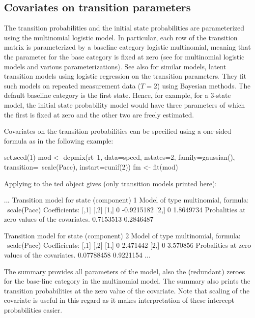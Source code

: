 \documentclass[article]{jss}
\begin{document}
\subsection{Covariates on transition parameters}

The transition probabilities and the initial state probabilities
are parameterized using the multinomial
logistic model.   In particular, each row of the transition matrix is
parameterized by a baseline category logistic multinomial, 
meaning that the parameter for the
base category is fixed at zero (see \citet[see][p.\ 267
ff.]{Agresti2002} for multinomial logistic models and various
parameterizations). See also \citet{Chung2007} for similar models, latent transition models using logistic regression on the transition parameters. They fit such models on repeated measurement
data ($T=2$) using Bayesian methods.  The default baseline category is the first state.
Hence, for example, for a 3-state model, the initial state probability
model would have three parameters of which the first is fixed at zero
and the other two are freely estimated.

Covariates on the transition probabilities can be specified using a
one-sided formula as in the following example:
\begin{CodeChunk}
\begin{CodeInput}
set.seed(1)
mod <- depmix(rt~1, data=speed, nstates=2, family=gaussian(), 
  transition=~scale(Pacc), instart=runif(2))
fm <- fit(mod)
\end{CodeInput}
\end{CodeChunk}

Applying  to the ted object gives (only transition models
printed here): 
\begin{CodeChunk}
\begin{CodeOutput}
...
Transition model for state (component) 1 
Model of type multinomial, formula: ~scale(Pacc)
Coefficients: 
	 [,1]       [,2]
[1,]    0 -0.9215182
[2,]    0  1.8649734
Probalities at zero values of the covariates.
0.7153513 0.2846487 

Transition model for state (component) 2 
Model of type multinomial, formula: ~scale(Pacc)
Coefficients: 
	 [,1]     [,2]
[1,]    0 2.471442
[2,]    0 3.570856
Probalities at zero values of the covariates.
0.07788458 0.9221154
...
\end{CodeOutput}
\end{CodeChunk}
The summary provides all parameters of the model, also the 
(redundant) zeroes for the base-line category in the multinomial model. 
The summary also prints the transition probabilities
at the zero value of the covariate. Note that scaling of the covariate 
is useful in this regard as it makes interpretation of these intercept probabilities 
easier. 
\end{document}
